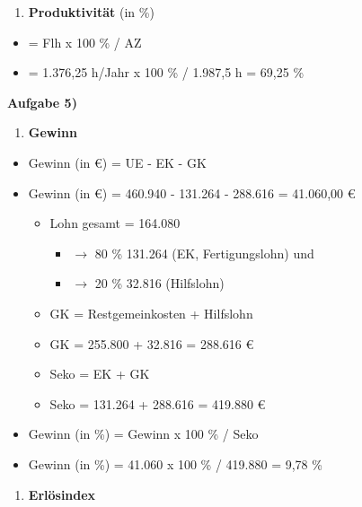 \begin{enumerate}
\def\labelenumi{\alph{enumi})}
\setcounter{enumi}{2}
\item
  \textbf{Produktivität} (in \%)
\end{enumerate}

\begin{itemize}
\item
  = Flh x 100 \% / AZ
\item
  = 1.376,25 h/Jahr x 100 \% / 1.987,5 h = 69,25 \%
\end{itemize}

\textbf{Aufgabe 5)}

\begin{enumerate}
\def\labelenumi{\alph{enumi})}
\item
  \textbf{Gewinn}
\end{enumerate}

\begin{itemize}
\item
  Gewinn (in €) = UE - EK - GK
\item
  Gewinn (in €) = 460.940 - 131.264 - 288.616 = 41.060,00 €

  \begin{itemize}
  \item
    Lohn gesamt = 164.080

    \begin{itemize}
    \item
      $\to$ 80 \% 131.264 (EK, Fertigungslohn) und
    \item
      $\to$ 20 \% 32.816 (Hilfslohn)
    \end{itemize}
  \item
    GK = Restgemeinkosten + Hilfslohn
  \item
    GK = 255.800 + 32.816 = 288.616 €
  \item
    Seko = EK + GK
  \item
    Seko = 131.264 + 288.616 = 419.880 €
  \end{itemize}
\item
  Gewinn (in \%) = Gewinn x 100 \% / Seko
\item
  Gewinn (in \%) = 41.060 x 100 \% / 419.880 = 9,78 \%
\end{itemize}

\begin{enumerate}
\def\labelenumi{\alph{enumi})}
\setcounter{enumi}{1}
\item
  \textbf{Erlösindex}
\end{enumerate}

